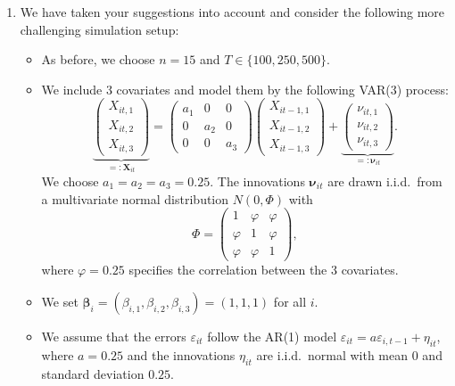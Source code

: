 \documentclass[a4paper,12pt]{article}
\begin{document}
\begin{enumerate}[label=\arabic*.,leftmargin=0.6cm]
\begin{enumerate}[label=(\roman*),leftmargin=0.75cm,topsep=0pt]
\item We have taken your suggestions into account and consider the following more challenging simulation setup:

\begin{itemize}[leftmargin=0.45cm,itemsep=0pt,topsep=0pt]

\item As before, we choose $n=15$ and $T \in \{100,250,500\}$. 
  
\item We include $3$ covariates and model them by the following VAR(3) process:
\[ \underbrace{\begin{pmatrix} X_{it,1} \\ X_{it,2} \\ X_{it,3} \end{pmatrix}}_{=: \boldsymbol{X}_{it}} = \begin{pmatrix} a_1 & 0 & 0 \\ 0 & a_2 & 0 \\ 0 & 0 & a_3 \end{pmatrix} \begin{pmatrix} X_{it-1,1} \\ X_{it-1,2} \\ X_{it-1,3} \end{pmatrix} + \underbrace{\begin{pmatrix} \nu_{it,1} \\ \nu_{it,2} \\ \nu_{it,3} \end{pmatrix}}_{=: \boldsymbol{\nu}_{it}}. \] 
We choose $a_1 = a_2 = a_3 = 0.25$. The innovations $\boldsymbol{\nu}_{it}$ are drawn i.i.d.\ from a multivariate normal distribution $N(0,\Phi)$ with
\[ \Phi = \begin{pmatrix} 1 & \varphi & \varphi \\ \varphi & 1 & \varphi \\ \varphi & \varphi & 1 \end{pmatrix}, \]
where $\varphi = 0.25$ specifies the correlation between the 3 covariates. 

\item We set $\boldsymbol{\beta}_i = (\beta_{i,1},\beta_{i,2},\beta_{i,3}) = (1,1,1)$ for all $i$.

\item We assume that the errors $\varepsilon_{it}$ follow the AR(1) model $\varepsilon_{it} = a \varepsilon_{i,t-1} + \eta_{it}$, where $a=0.25$ and the innovations $\eta_{it}$ are i.i.d.\ normal with mean $0$ and standard deviation $0.25$.


\end{itemize}
\end{enumerate}
\end{enumerate}
\end{document}
